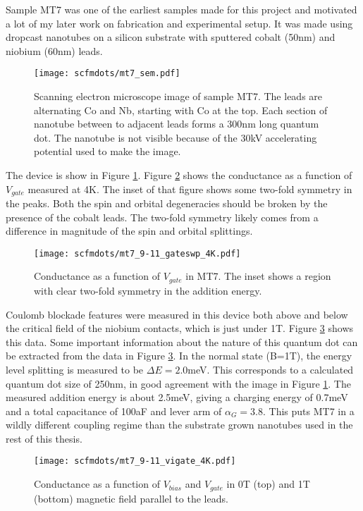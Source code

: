 Sample MT7 was one of the earliest samples made for this project and motivated a lot of my later work on fabrication and experimental setup. It was made using dropcast nanotubes on a silicon substrate with sputtered cobalt (50nm) and niobium (60nm) leads. 

\begin{figure}
    \centering
    \texttt{[image: scfmdots/mt7\_sem.pdf]}
    \caption{Scanning electron microscope image of sample MT7. The leads are alternating Co and Nb, starting with Co at the top. Each section of nanotube between to adjacent leads forms a 300nm long quantum dot. The nanotube is not visible because of the 30kV accelerating potential used to make the image.}
    \label{fig:mt7}
\end{figure}

The device is show in Figure \ref{fig:mt7}. Figure \ref{fig:mt7_gate} shows the conductance as a function of $V_{gate}$ measured at 4K. The inset of that figure shows some two-fold symmetry in the peaks. Both the spin and orbital degeneracies should be broken by the presence of the cobalt leads. The two-fold symmetry likely comes from a difference in magnitude of the spin and orbital splittings.

\begin{figure}
    \centering
    \texttt{[image: scfmdots/mt7\_9-11\_gateswp\_4K.pdf]}
    \caption{Conductance as a function of $V_{gate}$ in MT7. The inset shows a region with clear two-fold symmetry in the addition energy.}
    \label{fig:mt7_gate}
\end{figure}

Coulomb blockade features were measured in this device both above and below the critical field of the niobium contacts, which is just under 1T. Figure \ref{fig:mt7_coulomb} shows this data. Some important information about the nature of this quantum dot can be extracted from the data in Figure \ref{fig:mt7_coulomb}. In the normal state (B=1T), the energy level splitting is measured to be $\Delta E  = 2.0$meV. This corresponds to a calculated quantum dot size of 250nm, in good agreement with the image in Figure \ref{fig:mt7}. The measured addition energy is about 2.5meV, giving a charging energy of 0.7meV and a total capacitance of 100aF and lever arm of $\alpha_G = 3.8$. This puts MT7 in a wildly different coupling regime than the substrate grown nanotubes used in the rest of this thesis.

\begin{figure}
    \centering
    \texttt{[image: scfmdots/mt7\_9-11\_vigate\_4K.pdf]}
    \caption{Conductance as a function of $V_{bias}$ and $V_{gate}$ in 0T (top) and 1T (bottom) magnetic field parallel to the leads.}
    \label{fig:mt7_coulomb}
\end{figure}

